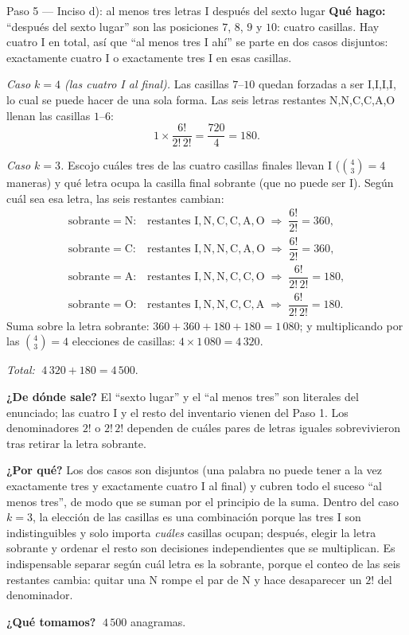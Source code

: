 \documentclass[11pt]{article}
\begin{document}
\begin{paso}{Paso 5 --- Inciso d): al menos tres letras I después del sexto lugar}
\textbf{Qué hago:} ``después del sexto lugar'' son las posiciones $7$, $8$, $9$ y $10$: cuatro casillas.
Hay cuatro I en total, así que ``al menos tres I ahí'' se parte en dos casos disjuntos: exactamente cuatro
I o exactamente tres I en esas casillas.

\medskip
\emph{Caso $k=4$ (las cuatro I al final).} Las casillas $7$--$10$ quedan forzadas a ser I,I,I,I, lo cual se
puede hacer de una sola forma. Las seis letras restantes N,N,C,C,A,O llenan las casillas $1$--$6$:
\[
1\times\frac{6!}{2!\,2!}=\frac{720}{4}=180 .
\]

\medskip
\emph{Caso $k=3$.} Escojo cuáles tres de las cuatro casillas finales llevan I ($\binom{4}{3}=4$ maneras) y
qué letra ocupa la casilla final sobrante (que no puede ser I). Según cuál sea esa letra, las seis
restantes cambian:
\[
\begin{array}{ll}
\text{sobrante}=\text{N}: & \text{restantes } \text{I},\text{N},\text{C},\text{C},\text{A},\text{O}\;\Rightarrow\;\dfrac{6!}{2!}=360,\\[6pt]
\text{sobrante}=\text{C}: & \text{restantes } \text{I},\text{N},\text{N},\text{C},\text{A},\text{O}\;\Rightarrow\;\dfrac{6!}{2!}=360,\\[6pt]
\text{sobrante}=\text{A}: & \text{restantes } \text{I},\text{N},\text{N},\text{C},\text{C},\text{O}\;\Rightarrow\;\dfrac{6!}{2!\,2!}=180,\\[6pt]
\text{sobrante}=\text{O}: & \text{restantes } \text{I},\text{N},\text{N},\text{C},\text{C},\text{A}\;\Rightarrow\;\dfrac{6!}{2!\,2!}=180 .
\end{array}
\]
Suma sobre la letra sobrante: $360+360+180+180=1\,080$; y multiplicando por las $\binom{4}{3}=4$
elecciones de casillas: $4\times1\,080=4\,320$.

\medskip
\emph{Total:} $\;4\,320+180=4\,500 .$

\textbf{¿De dónde sale?} El ``sexto lugar'' y el ``al menos tres'' son literales del enunciado; las cuatro
I y el resto del inventario vienen del Paso 1. Los denominadores $2!$ o $2!\,2!$ dependen de cuáles pares
de letras iguales sobrevivieron tras retirar la letra sobrante.

\textbf{¿Por qué?} Los dos casos son disjuntos (una palabra no puede tener a la vez exactamente tres y
exactamente cuatro I al final) y cubren todo el suceso ``al menos tres'', de modo que se suman por el
principio de la suma. Dentro del caso $k=3$, la elección de las casillas es una combinación porque las
tres I son indistinguibles y solo importa \emph{cuáles} casillas ocupan; después, elegir la letra sobrante
y ordenar el resto son decisiones independientes que se multiplican. Es indispensable separar según cuál
letra es la sobrante, porque el conteo de las seis restantes cambia: quitar una N rompe el par de N y hace
desaparecer un $2!$ del denominador.

\textbf{¿Qué tomamos?} $\;4\,500$ anagramas.
\end{paso}
\end{document}
